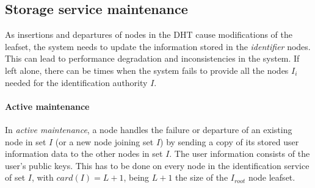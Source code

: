 
\subsection{Storage service maintenance}
\label{sec:lazy_node_maintenance}


As insertions and departures of nodes in the DHT cause modifications of the
leafset, the system needs to update the information stored in the
\textit{identifier} nodes. This can lead to performance degradation and inconsistencies in the
system. If left alone, there can be times when the system
fails to provide all the nodes $I_i$ needed for the identification authority
$I$.



\paragraph{Active maintenance}
  In \textit{active maintenance}, a
node handles the failure or departure of an existing node in set $I$ (or a new
node joining set $I$) by sending a copy of its stored user
information data to the other nodes in set $I$.
The user information consists of the user's public keys. This has to be done on
every node in the identification service of set
$I$, with $card(I) = L+1$, being $L+1$ the size of the $I_{root}$ node leafset.

